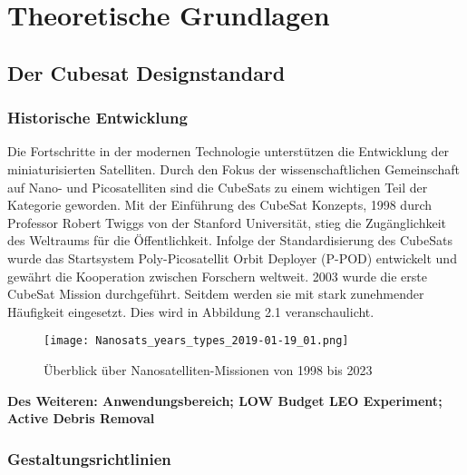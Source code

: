 \chapter{Theoretische Grundlagen}
\section{Der Cubesat Designstandard}
	\subsection{Historische Entwicklung}
	
	\begin{flushleft}
Die Fortschritte in der modernen Technologie unterstützen die Entwicklung der miniaturisierten Satelliten. Durch den Fokus der 			wissenschaftlichen Gemeinschaft auf Nano- und Picosatelliten sind die CubeSats zu einem wichtigen Teil der Kategorie geworden. Mit der Einführung des CubeSat Konzepts, 1998 durch Professor Robert Twiggs von der Stanford Universität, stieg die Zugänglichkeit des Weltraums für die Öffentlichkeit. Infolge der Standardisierung des CubeSats wurde das Startsystem Poly-Picosatellit Orbit Deployer (P-POD) entwickelt und gewährt die Kooperation zwischen Forschern weltweit.  2003 wurde die  erste CubeSat Mission durchgeführt. Seitdem werden sie mit stark zunehmender Häufigkeit eingesetzt. Dies wird in Abbildung 2.1 veranschaulicht.
	\end{flushleft}
	
	\begin{figure}
		\centering
			\texttt{[image: Nanosats\_years\_types\_2019-01-19\_01.png]}
		\caption{Überblick über Nanosatelliten-Missionen von 1998 bis 2023}
		\label{fig:Nanosats_years_types_2019-01-19_01}
	\end{figure}
		\textbf{Des Weiteren: Anwendungsbereich; LOW Budget LEO Experiment; Active Debris Removal}
	\newpage
	
	\subsection{Gestaltungsrichtlinien}
	
